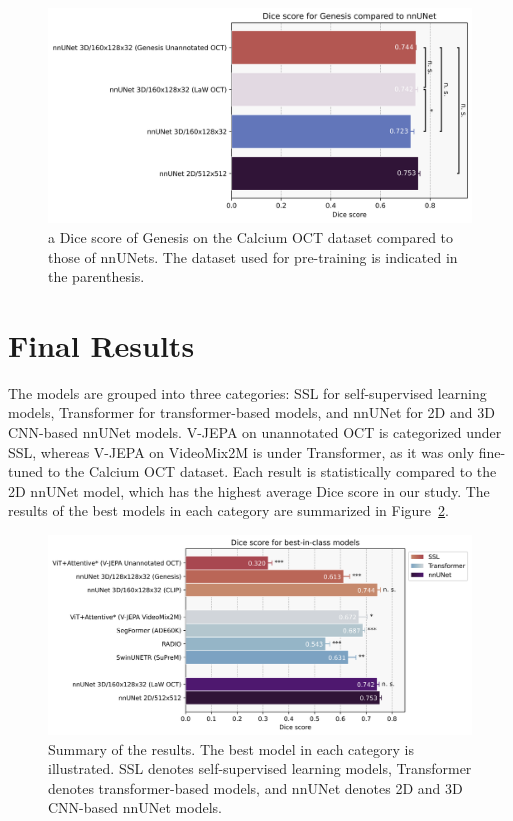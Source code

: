 \documentclass[a4paper,11pt,oneside]{report}
\begin{document}
\begin{figure}[h]
    \centering
    \includegraphics[width=0.65\linewidth]{figures/result_nnUNet_and_Genesis_results.png}
    \caption{a Dice score of Genesis on the Calcium OCT dataset compared to those of nnUNets. The dataset used for pre-training is indicated in the parenthesis.
    }
    \label{fig:genesis-results}    
\end{figure}


\section{Final Results}
The models are grouped into three categories: SSL for self-supervised learning models, Transformer for transformer-based models, and nnUNet for 2D and 3D CNN-based nnUNet models. V-JEPA on unannotated OCT is categorized under SSL, whereas V-JEPA on VideoMix2M is under Transformer, as it was only fine-tuned to the Calcium OCT dataset. Each result is statistically compared to the 2D nnUNet model, which has the highest average Dice score in our study. The results of the best models in each category are summarized in Figure~\ref{fig:results}.

\begin{figure}[hbt]
    \centering
    \includegraphics[width=1\textwidth]{figures/result_best_in_class_results.png}
    \caption{Summary of the results. The best model in each category is illustrated. SSL denotes self-supervised learning models, Transformer denotes transformer-based models, and nnUNet denotes 2D and 3D CNN-based nnUNet models.}
    \label{fig:results}
\end{figure}
\end{document}
